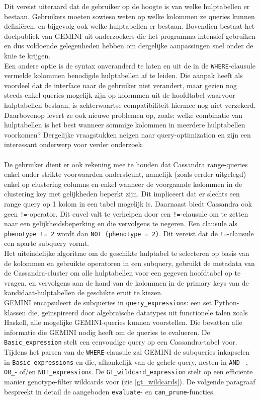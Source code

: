 Dit vereist uiteraard dat de gebruiker op de hoogte is van welke hulptabellen er bestaan. Gebruikers moeten sowieso weten op welke kolommen ze queries kunnen defini\"eren, en bijgevolg ook welke hulptabellen er bestaan. Bovendien bestaat het doelpubliek van GEMINI uit onderzoekers die het programma intensief gebruiken en dus voldoende gelegenheden hebben om dergelijke aanpassingen snel onder de knie te krijgen.\\
Een andere optie is de syntax onveranderd te laten en uit de in de \texttt{WHERE}-clausule vermelde kolommen benodigde hulptabellen af te leiden. Die aanpak heeft als voordeel dat de interface naar de gebruiker niet verandert, maar gezien nog steeds enkel queries mogelijk zijn op kolommen uit de hoofdtabel waarvoor hulptabellen bestaan, is achterwaartse compatibiliteit hiermee nog niet verzekerd. Daarbovenop levert ze ook nieuwe problemen op, zoals: welke combinatie van hulptabellen is het best wanneer sommige kolommen in meerdere hulptabellen voorkomen? Dergelijke vraagstukken neigen naar query-optimization en zijn een interessant onderwerp voor verder onderzoek.\\\\
De gebruiker dient er ook rekening mee te houden dat Cassandra range-queries enkel onder strikte voorwaarden ondersteunt, namelijk (zoals eerder uitgelegd) enkel op clustering columns en enkel wanneer de voorgaande kolommen in de clustering key met gelijkheden beperkt zijn. Dit impliceert dat er slechts een range query op 1 kolom in een tabel mogelijk is. Daarnaast biedt Cassandra ook geen \texttt{!=}-operator. Dit euvel valt te verhelpen door een \texttt{!=}-clausule om te zetten naar een gelijkheidsbeperking en die vervolgens te negeren. Een clausule als \texttt{phenotype != 2} wordt dan \texttt{NOT (phenotype = 2)}. Dit vereist dat de \texttt{!=}-clausule een aparte subquery vormt.\\

Het uiteindelijke algoritme om de geschikte hulptabel te selecteren op basis van de kolommen en gebruikte operatoren in een subquery, gebruikt de metadata van de Cassandra-cluster om alle hulptabellen voor een gegeven hoofdtabel op te vragen, en vervolgens aan de hand van de kolommen in de primary keys van de kandidaat-hulptabellen de geschikte eruit te kiezen.\\

GEMINI encapsuleert de subqueries in \texttt{query\_expression}s: een set Python-klassen die, ge\"inspireerd door algebra\"ische datatypes uit functionele talen zoals Haskell, alle mogelijke GEMINI-queries kunnen voorstellen. Die bevatten alle informatie die GEMINI nodig heeft om de queries te evalueren. De \texttt{Basic\_expression} stelt een eenvoudige query op een Cassandra-tabel voor. Tijdens het parsen van de \texttt{WHERE}-clausule zal GEMINI de subqueries inkapselen in \texttt{Basic\_expressions} en die, afhankelijk van de gehele query, nesten in \texttt{AND\_}-, \texttt{OR\_}- of/en \texttt{NOT\_expression}s. De \texttt{GT\_wildcard\_expression} stelt op een effici\"ente manier genotype-filter wildcards voor (zie \ref{gt_wildcards}). De volgende paragraaf bespreekt in detail de aangeboden \texttt{evaluate}- en \texttt{can\_prune}-functies.

